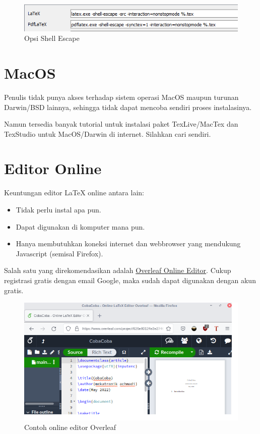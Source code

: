 \documentclass{book} %
\begin{document}
	\begin{figure}[!ht]
		\centering
		\includegraphics[width=400pt]{images/texstudiowin1}
		\caption{Opsi Shell Escape}
	\end{figure}

	\section{MacOS}

	Penulis tidak punya akses terhadap sistem operasi MacOS maupun turunan Darwin/BSD lainnya,
	sehingga tidak dapat mencoba sendiri proses instalasinya.

	Namun tersedia banyak tutorial untuk instalasi paket TexLive/MacTex dan TexStudio untuk MacOS/Darwin di internet.
	Silahkan cari sendiri.

	\newpage
	\section{Editor Online}

	Keuntungan editor \LaTeX{} online antara lain:
	\begin{itemize}
		\item Tidak perlu instal apa pun.
		\item Dapat digunakan di komputer mana pun.
		\item Hanya membutuhkan koneksi internet dan webbrowser yang mendukung Javascript (semisal Firefox).
	\end{itemize}

	Salah satu yang direkomendasikan adalah \href{https://www.overleaf.com/project}{Overleaf Online Editor}.
	Cukup registrasi gratis dengan email Google, maka sudah dapat digunakan dengan akun gratis.

	\begin{figure}[!ht]
		\centering
		\includegraphics[width=400pt]{images/overleaf}
		\caption{Contoh online editor Overleaf}
	\end{figure}
\end{document}
